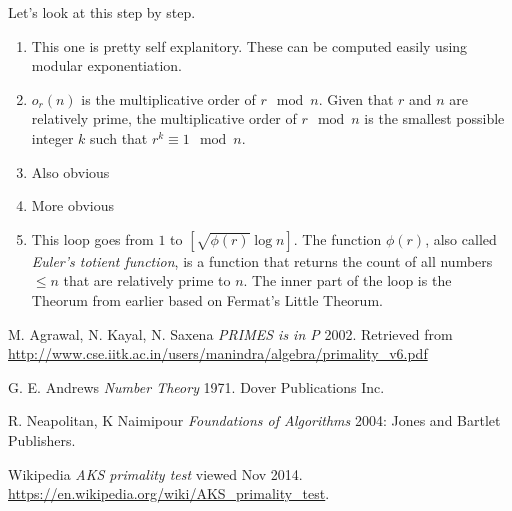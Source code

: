 \documentclass[11pt]{article}
\begin{document}
Let's look at this step by step.
\begin{enumerate}
  \item This one is pretty self explanitory. These can be computed easily using modular exponentiation.
  \item $o_r(n)$ is the multiplicative order of $r \mod n$. Given that $r$ and $n$ are relatively prime, the multiplicative order of $r \mod n$ is the smallest possible integer $k$ such that $r^k \equiv 1\mod n$.
  \item Also obvious
  \item More obvious
  \item This loop goes from $1$ to $[\sqrt{\phi(r)}\log{n}]$. The function $\phi(r)$, also called \emph{Euler's totient function}, is a function that returns the count of all numbers $\le n$ that are relatively prime to $n$. The inner part of the loop is the Theorum from earlier based on Fermat's Little Theorum. 
\end{enumerate}
\newpage
\begin{thebibliography}{1}

   M. Agrawal, N. Kayal, N. Saxena {\em PRIMES is in P}  2002. Retrieved from \url{http://www.cse.iitk.ac.in/users/manindra/algebra/primality_v6.pdf}
  
   G. E. Andrews {\em Number Theory} 1971. Dover Publications Inc.

   R. Neapolitan, K Naimipour {\em Foundations of Algorithms } 2004: Jones and Bartlet Publishers.

   Wikipedia {\em AKS primality test} viewed Nov 2014. \url{https://en.wikipedia.org/wiki/AKS_primality_test}.

\end{thebibliography}
\end{document}
